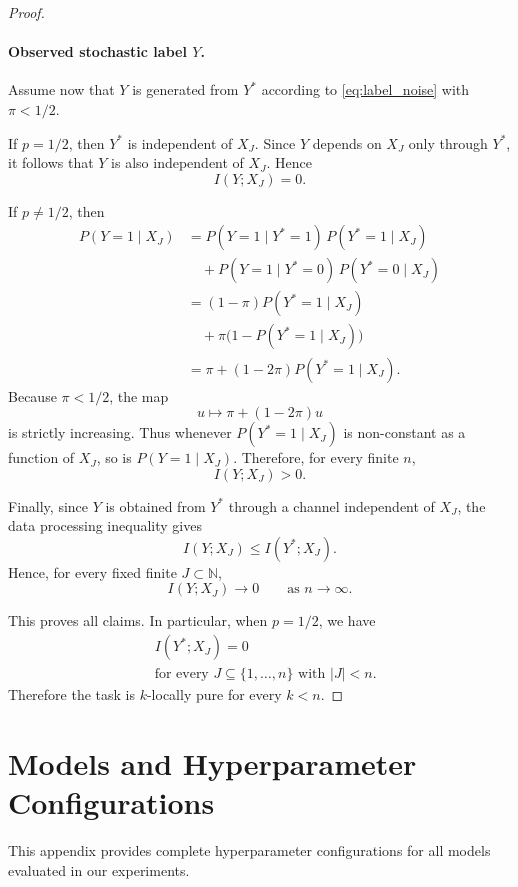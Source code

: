 \documentclass[fullpaper]{nldl}
\theoremstyle{plain}
\theoremstyle{definition}
\theoremstyle{remark}
\begin{document}
\begin{proof}
\paragraph{Observed stochastic label \(Y\).}
Assume now that \(Y\) is generated from \(Y^*\) according to \eqref{eq:label_noise}
with \(\pi<1/2\).

If \(p=1/2\), then \(Y^*\) is independent of \(X_J\). Since \(Y\) depends on \(X_J\)
only through \(Y^*\), it follows that \(Y\) is also independent of \(X_J\). Hence
\[
I(Y;X_J)=0.
\]

If \(p\neq 1/2\), then
\begin{align*}
P(Y=1\mid X_J)
&=
P(Y=1\mid Y^*=1)\,P(Y^*=1\mid X_J) \\
&\quad +
P(Y=1\mid Y^*=0)\,P(Y^*=0\mid X_J) \\
&=
(1-\pi)P(Y^*=1\mid X_J)\\
&\quad+
\pi\bigl(1-P(Y^*=1\mid X_J)\bigr) \\
&=
\pi + (1-2\pi)P(Y^*=1\mid X_J).
\end{align*}
Because \(\pi<1/2\), the map
\[
u \mapsto \pi + (1-2\pi)u
\]
is strictly increasing. Thus whenever \(P(Y^*=1\mid X_J)\) is non-constant as a
function of \(X_J\), so is \(P(Y=1\mid X_J)\). Therefore, for every finite \(n\),
\[
I(Y;X_J)>0.
\]

Finally, since \(Y\) is obtained from \(Y^*\) through a channel independent of \(X_J\),
the data processing inequality gives
\[
I(Y;X_J)\le I(Y^*;X_J).
\]
Hence, for every fixed finite \(J\subset\mathbb N\),
\[
I(Y;X_J)\to 0
\qquad\text{as } n\to\infty.
\]

This proves all claims. In particular, when \(p=1/2\), we have
\[
\begin{aligned}
&I(Y^*;X_J)=0\\
&\text{for every } J\subseteq \{1,\ldots,n\}\text{ with } |J|<n.
\end{aligned}
\]
Therefore the task is \(k\)-locally pure for every \(k<n\).
\end{proof}


\section{Models and Hyperparameter Configurations}
\label{appendix:training}

This appendix provides complete hyperparameter configurations for all models evaluated in our experiments.
\end{document}
